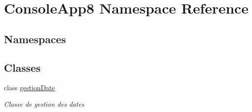 \hypertarget{namespace_console_app8}{}\section{Console\+App8 Namespace Reference}
\label{namespace_console_app8}
\subsection*{Namespaces}
\begin{DoxyCompactItemize}
\end{DoxyCompactItemize}
\subsection*{Classes}
\begin{DoxyCompactItemize}
\item 
class \mbox{\hyperlink{class_console_app8_1_1gestion_date}{gestion\+Date}}
\begin{DoxyCompactList}\small\item\em Classe de gestion des dates \end{DoxyCompactList}\end{DoxyCompactItemize}

